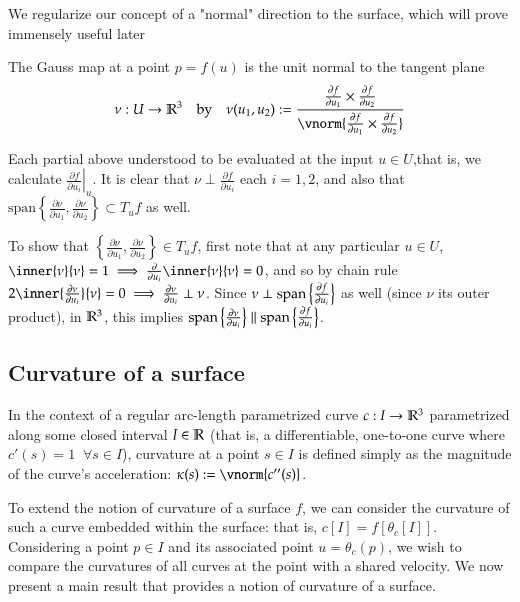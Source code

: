 We regularize our concept of a "normal" direction to the surface, which will prove immensely useful later 
\begin{defn}
The Gauss map at a point $p = f(u)$ is the unit normal to the tangent plane
\[\nu : U \to \R^3 \quad\textrm{by}\quad  \nu(u_1, u_2) :=
\frac{\frac{\partial f}{\partial u_1} \times \frac{\partial f}{\partial u_2}}
{\vnorm{\frac{\partial f}{\partial u_1} \times \frac{\partial f}{\partial u_2}}} \]
\end{defn}
Each partial above understood to be evaluated at the input $u \in U$,that is, we calculate $\left.\frac{\partial f}{\partial u_i}\right|_u$.
It is clear that $\nu \perp \frac{\partial f}{\partial u_i}$ each $i=1,2$, and also that
$\textrm{span}\left\{ \frac{\partial \nu}{\partial u_1}, \frac{\partial \nu}{\partial u_2}\right\} \subset T_u f$ as well.

To show that $\left\{\frac{\partial \nu}{\partial u_1} , \frac{\partial \nu}{\partial u_2}\right\} \in T_u f$,
first note that at any particular $u \in U$,
$\inner{\nu}{\nu} = 1 \implies \frac{\partial}{\partial u_i} \inner{\nu}{\nu} = 0$,
and so by chain rule $2\inner{\frac{\partial \nu}{\partial u_i}}{\nu} = 0
\implies \frac{\partial \nu}{\partial u_i} \perp \nu $.
Since $ \nu \perp \mathrm{span}\left\{\frac{\partial f}{\partial u_i}\right\} $ as well (since $\nu$ its outer product), in  $\mathbb{R}^3$, this implies
$\mathrm{span}\left\{\frac{\partial \nu}{\partial u_i}\right\} \parallel
\mathrm{span}\left\{\frac{\partial f}{\partial u_i}\right\}$.

    \subsection{Curvature of a surface}
    In the context of a regular arc-length parametrized curve $c: I \to \mathbb{R}^3$ parametrized along some closed interval $I\in \mathbb{R}$
     (that is, a differentiable, one-to-one curve where $c'(s) = 1 \;\; \forall s \in I$), curvature at a point $s \in I$ is defined simply as the magnitude of the curve's acceleration: $\kappa(s) := \vnorm{c''(s)}$.
 
 To extend the notion of curvature of a surface $f$, we can consider the curvature of such a curve embedded within the surface: that is, $c[I] = f[\theta_c[I]]$. Considering a point $p \in I$ and its associated point $u = \theta_c(p)$, we wish to compare the curvatures of all curves at the point with a shared velocity. We now present a main result that provides a notion of curvature of a surface.
	
